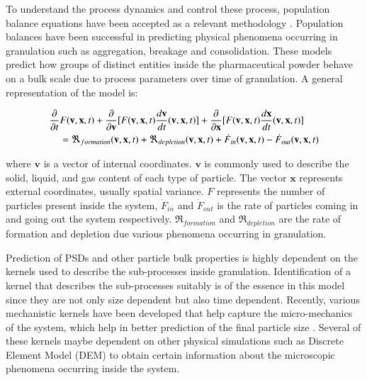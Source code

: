 \documentclass[preprint,10pt,authoryear]{elsarticle}
\begin{document}
\begin{linenumbers}
To understand the process dynamics and control these process, population balance equations 
have been accepted as a relevant methodology \citep{Immanuel2005}. Population balances have been successful in 
predicting physical phenomena occurring in granulation such as aggregation, breakage and 
consolidation. These models predict how groups of distinct entities inside the pharmaceutical 
powder behave on a bulk scale due to process parameters over time of granulation. A
general representation of the model is:

\begin{align}
\frac{ \partial}{\partial t}&F(\textbf{v},\textbf{x},t) + \frac{\partial}{\partial 
\textbf{v}}[F(\textbf{v},\textbf{x},t)\frac{d\textbf{v}}{dt}(\textbf{v},\textbf{x},t)] 
+ \frac{\partial}{\partial \textbf{x}}[F(\textbf{v},\textbf{x},t)\frac{d\textbf{x}}{dt}
(\textbf{v},\textbf{x},t)] \notag\\
    &= 
\Re_{formation}(\textbf{v},\textbf{x},t)+\Re_{depletion}(\textbf{v},\textbf{x},t)
+\dot{F}_{in}(\textbf{v},\textbf{x},t) -\dot{F}_{out}(\textbf{v},\textbf{x},t) 
\label{eqn:bkgd_pbm_general} 
\end{align}

where $\textbf{v}$ is a vector of internal 
coordinates.  $\textbf{v}$ is commonly used to describe the solid, liquid, 
and gas content of each type of particle. The vector $\textbf{x}$ represents 
external coordinates, usually spatial variance. $F$ represents the 
number of particles present inside the system, $\dot{F}_{in}$ 
and $\dot{F}_{out}$ is the rate of particles coming in and going out the 
system respectively. $\Re_{formation}$ and $\Re_{depletion}$ are the rate of 
formation and depletion due various phenomena occurring in granulation. 

Prediction of PSDs and other particle bulk properties is highly dependent on 
the kernels used to describe the sub-processes inside granulation. Identification 
of a kernel that describes the sub-processes suitably is of the essence in this model 
since they are not only size dependent but also time dependent. Recently, various 
mechanistic kernels have been developed that help capture the micro-mechanics of the 
system, which help in better prediction of the final particle size \citep{Barrasso2015processes}. 
Several of these kernels maybe dependent on other physical simulations such as Discrete 
Element Model (DEM) to obtain certain information about the microscopic phenomena 
occurring inside the system.



\end{linenumbers}
\end{document}
